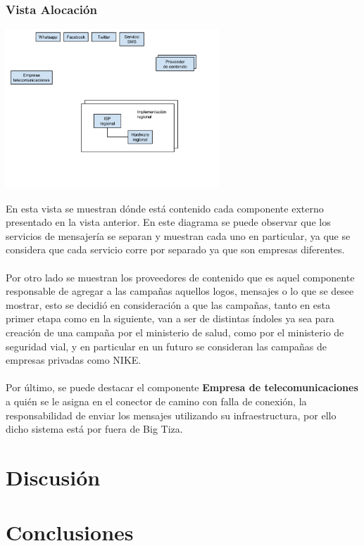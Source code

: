\documentclass[a4paper, 11pt]{article}
\begin{document}
\subsubsection{Vista Alocación}

\centerline{\includegraphics[width=0.6\textwidth]{./diagramas/VistaAlocacion.png}}

En esta vista se muestran dónde está contenido cada componente externo presentado en la vista anterior. En este diagrama se puede observar que los servicios de mensajería se separan y muestran cada uno en particular, ya que se considera que cada servicio corre por separado ya que son empresas diferentes.\\
\\
Por otro lado se muestran los proveedores de contenido que es aquel componente responsable de agregar a las campañas aquellos logos, mensajes o lo que se desee mostrar, esto se decidió en consideración a que las campañas, tanto en esta primer etapa como en la siguiente, van a ser de distintas índoles ya sea para creación de una campaña por el ministerio de salud, como por el ministerio de seguridad vial, y en particular en un futuro se consideran las campañas de empresas privadas como NIKE.\\
\\
Por último, se puede destacar el componente \textbf{Empresa de telecomunicaciones} a quién se le asigna en el conector de camino con falla de conexión, la responsabilidad de enviar los mensajes utilizando su infraestructura, por ello dicho sistema está por fuera de Big Tiza.



\newpage
\section{Discusión}

\newpage
\section{Conclusiones}


\end{document}

